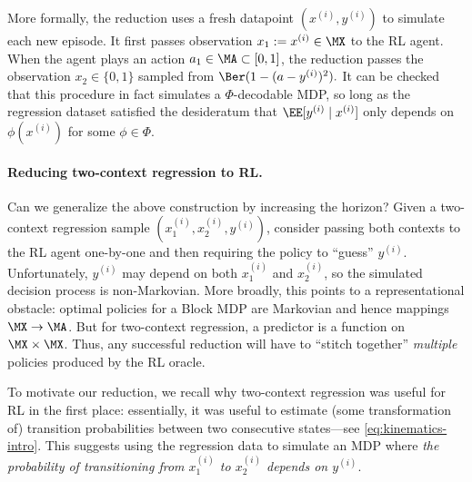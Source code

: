 More formally, the reduction uses a fresh datapoint $(x^{(i)},y^{(i)})$ to simulate each new episode. It first passes observation $x_1 := x^{(i)} \in \MX$ to the RL agent. When the agent plays an action $a_1 \in \MA \subset [0,1]$, the reduction passes the observation $x_2 \in \{0,1\}$ sampled from $\Ber(1 - (a - y^{(i)})^2).$ It can be checked that this procedure in fact simulates a $\Phi$-decodable MDP, so long as the regression dataset satisfied the desideratum that $\EE[y^{(i)}\mid{} x^{(i)}]$ only depends on $\phi(x^{(i)})$ for some $\phi \in \Phi$.

\paragraph{Reducing two-context regression to RL.} Can we generalize the above construction by increasing the horizon? Given a two-context regression sample $(x_1^{(i)}, x_2^{(i)},y^{(i)})$, consider passing both contexts to the RL agent one-by-one and then requiring the policy to ``guess'' $y^{(i)}$. Unfortunately, $y^{(i)}$ may depend on both $x_1^{(i)}$ and $x_2^{(i)}$, so the simulated decision process is non-Markovian. More broadly, this points to a representational obstacle: optimal policies for a Block MDP are Markovian and hence mappings $\MX \to \MA$. But for two-context regression, a predictor is a function on $\MX \times \MX$. Thus, any successful reduction will have to ``stitch together'' \emph{multiple} policies produced by the RL oracle.

To motivate our reduction, we recall why two-context regression was useful for RL in the first place: essentially, it was useful to estimate (some transformation of) transition probabilities between two consecutive states---see \cref{eq:kinematics-intro}. This suggests using the regression data to simulate an MDP where \emph{the probability of transitioning from $x_1^{(i)}$ to $x_2^{(i)}$ depends on $y^{(i)}$}.


